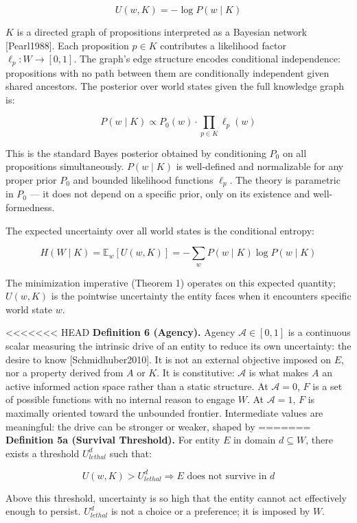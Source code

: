 \documentclass[
]{article}
\begin{document}
\[U(w, K) = -\log P(w \mid K)\]

\(K\) is a directed graph of propositions interpreted as a Bayesian
network {[}Pearl1988{]}. Each proposition \(p \in K\) contributes a
likelihood factor \(\ell_p : W \to [0,1]\). The graph's edge structure
encodes conditional independence: propositions with no path between them
are conditionally independent given shared ancestors. The posterior over
world states given the full knowledge graph is:

\[P(w \mid K) \propto P_0(w) \cdot \prod_{p \in K} \ell_p(w)\]

This is the standard Bayes posterior obtained by conditioning \(P_0\) on
all propositions simultaneously. \(P(w \mid K)\) is well-defined and
normalizable for any proper prior \(P_0\) and bounded likelihood
functions \(\ell_p\). The theory is parametric in \(P_0\) --- it does
not depend on a specific prior, only on its existence and
well-formedness.

The expected uncertainty over all world states is the conditional
entropy:

\[H(W \mid K) = \mathbb{E}_w[U(w, K)] = -\sum_w P(w \mid K) \log P(w \mid K)\]

The minimization imperative (Theorem 1) operates on this expected
quantity; \(U(w, K)\) is the pointwise uncertainty the entity faces when
it encounters specific world state \(w\).

<<<<<<< HEAD
\textbf{Definition 6 (Agency).} Agency \(\mathcal{A} \in [0, 1]\) is a
continuous scalar measuring the intrinsic drive of an entity to reduce
its own uncertainty: the desire to know {[}Schmidhuber2010{]}. It is not
an external objective imposed on \(E\), nor a property derived from
\(A\) or \(K\). It is constitutive: \(\mathcal{A}\) is what makes \(A\)
an active informed action space rather than a static structure. At
\(\mathcal{A} = 0\), \(F\) is a set of possible functions with no
internal reason to engage \(W\). At \(\mathcal{A} = 1\), \(F\) is
maximally oriented toward the unbounded frontier. Intermediate values
are meaningful: the drive can be stronger or weaker, shaped by
=======
\textbf{Definition 5a (Survival Threshold).} For entity \(E\) in domain
\(d \subseteq W\), there exists a threshold \(U_{lethal}^d\) such that:

\[U(w, K) > U_{lethal}^d \Rightarrow E \text{ does not survive in } d\]

Above this threshold, uncertainty is so high that the entity cannot act
effectively enough to persist. \(U_{lethal}^d\) is not a choice or a
preference; it is imposed by \(W\).
\end{document}

